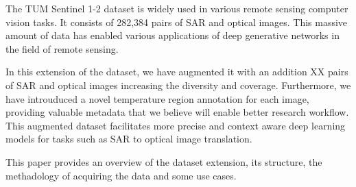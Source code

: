 The TUM Sentinel 1-2 dataset is widely used in various remote sensing computer vision tasks. It consists of 282,384 pairs of SAR and optical images. This massive amount of data has enabled various applications of deep generative networks in the field of remote sensing\cite{Zhang2023}.

In this extension of the dataset, we have augmented it with an addition XX pairs of SAR and optical images increasing the diversity and coverage. Furthermore, we have introuduced a novel temperature region annotation for each image, providing valuable metadata that we believe will enable better research workflow. This augmented dataset facilitates more precise and context aware deep learning models for tasks such as SAR to optical image translation.

This paper provides an overview of the dataset extension, its structure, the methadology of acquiring the data and some use cases.